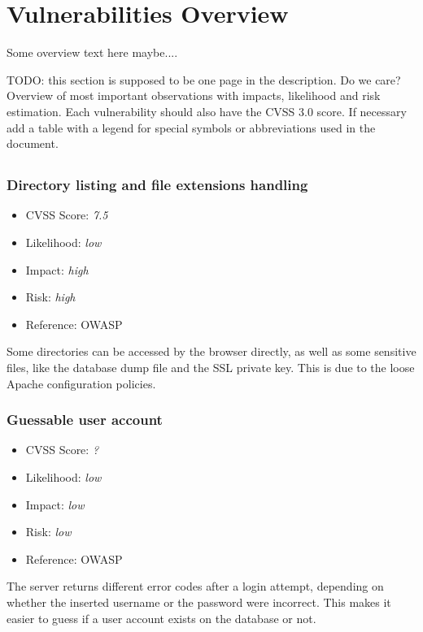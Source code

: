 \chapter{Vulnerabilities Overview}\label{chapter:vulnerabilities_overview}
Some overview text here maybe.... \newline

TODO: this section is supposed to be one page in the description. Do we care?\newline
Overview of most important observations with impacts, likelihood and risk estimation.
Each vulnerability should also have the CVSS 3.0 score. If necessary add a table with a legend for
special symbols or abbreviations used in the document.\newline

\section{\bs}
\subsection{Directory listing and file extensions handling} \label{over:vuln_1}
\begin{itemize}
	\item CVSS Score: \textit{7.5}
	\item Likelihood: \textit{low}
	\item Impact: \textit{high}
	\item Risk: \textit{high}
	\item Reference: OWASP 
\end{itemize}
Some directories can be accessed by the browser directly, as well as some sensitive files, like the database dump file and the SSL private key. This is due to the loose Apache configuration policies.

\subsection{Guessable user account} \label{over:vuln_2}
\begin{itemize}
	\item CVSS Score: \textit{?}
	\item Likelihood: \textit{low}
	\item Impact: \textit{low}
	\item Risk: \textit{low}
	\item Reference: OWASP 
\end{itemize}
The server returns different error codes after a login attempt, depending on whether the inserted username or the password were incorrect. This makes it easier to guess if a user account exists on the database or not.

